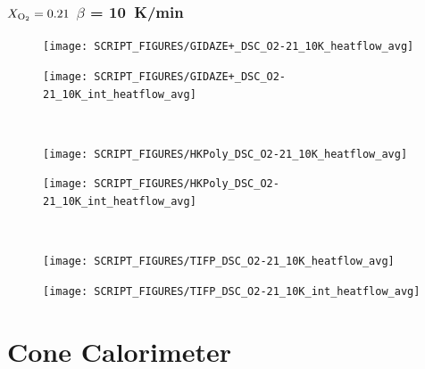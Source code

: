 \documentclass{book}
\begin{document}
\begin{landscape}
\subsection{$X_{\rm O_2}=0.21$ $\beta$ = 10~K/min}
\begin{minipage}{0.65\textwidth}
\begin{figure}[H]
{\texttt{[image: SCRIPT\_FIGURES/GIDAZE+\_DSC\_O2-21\_10K\_heatflow\_avg]}}\\
\end{figure}
\end{minipage} 
\begin{minipage}{0.35\textwidth}
\begin{figure}[H]
{\texttt{[image: SCRIPT\_FIGURES/GIDAZE+\_DSC\_O2-21\_10K\_int\_heatflow\_avg]}}\\
\end{figure}
\end{minipage}\\
\begin{minipage}{0.65\textwidth}
\begin{figure}[H]
{\texttt{[image: SCRIPT\_FIGURES/HKPoly\_DSC\_O2-21\_10K\_heatflow\_avg]}}\\
\end{figure}
\end{minipage} 
\begin{minipage}{0.35\textwidth}
\begin{figure}[H]
{\texttt{[image: SCRIPT\_FIGURES/HKPoly\_DSC\_O2-21\_10K\_int\_heatflow\_avg]}}\\
\end{figure}
\end{minipage}\\
\vfill
\begin{minipage}{0.65\textwidth}
\begin{figure}[H]
{\texttt{[image: SCRIPT\_FIGURES/TIFP\_DSC\_O2-21\_10K\_heatflow\_avg]}}\\
\end{figure}
\end{minipage} 
\begin{minipage}{0.35\textwidth}
\begin{figure}[H]
{\texttt{[image: SCRIPT\_FIGURES/TIFP\_DSC\_O2-21\_10K\_int\_heatflow\_avg]}}\\
\end{figure}
\end{minipage}


\chapter{Cone Calorimeter}

\end{landscape}
\end{document}
